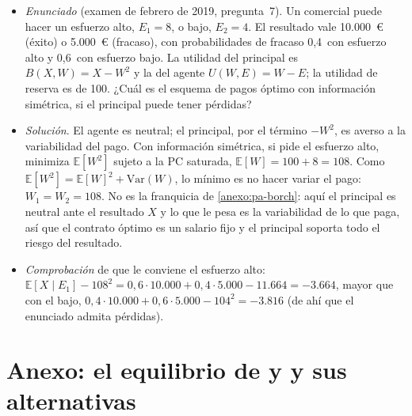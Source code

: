 \documentclass[11pt]{article}
\begin{document}
\begin{itemize}
\item \emph{Enunciado} (examen de febrero de 2019, pregunta~7). Un comercial puede hacer un esfuerzo alto, $E_1=8$, o bajo, $E_2=4$. El resultado vale 10.000~€ (éxito) o 5.000~€ (fracaso), con probabilidades de fracaso 0,4~con esfuerzo alto y 0,6~con esfuerzo bajo. La utilidad del principal es $B(X,W)=X-W^2$ y la del agente $U(W,E)=W-E$; la utilidad de reserva es de 100. ¿Cuál es el esquema de pagos óptimo con información simétrica, si el principal puede tener pérdidas?
\item \emph{Solución}. El agente es neutral; el principal, por el término $-W^2$, es averso a la variabilidad del pago. Con información simétrica, si pide el esfuerzo alto, minimiza $\mathbb{E}[W^2]$ sujeto a la PC saturada, $\mathbb{E}[W]=100+8=108$. Como $\mathbb{E}[W^2]=\mathbb{E}[W]^2+\mathrm{Var}(W)$, lo mínimo es no hacer variar el pago: $W_1=W_2=108$. No es la franquicia de \ref{anexo:pa-borch}: aquí el principal es neutral ante el resultado $X$ y lo que le pesa es la variabilidad de lo que paga, así que el contrato óptimo es un salario fijo y el principal soporta todo el riesgo del resultado.
\item \emph{Comprobación} de que le conviene el esfuerzo alto: $\mathbb{E}[X\mid E_1]-108^2=0{,}6\cdot 10.000+0{,}4\cdot 5.000-11.664=-3.664$, mayor que con el bajo, $0{,}4\cdot 10.000+0{,}6\cdot 5.000-104^2=-3.816$ (de ahí que el enunciado admita pérdidas).
\end{itemize}

\section{Anexo: el equilibrio de  y  y sus alternativas}\label{anexo:rothschild-stiglitz}
\end{document}
